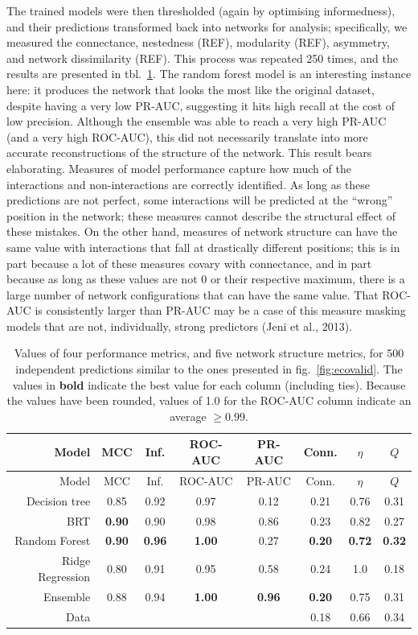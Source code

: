 \documentclass[11pt]{article}
\begin{document}
The trained models were then thresholded (again by optimising
informedness), and their predictions transformed back into networks for
analysis; specifically, we measured the connectance, nestedness (REF),
modularity (REF), asymmetry, and network dissimilarity (REF). This
process was repeated 250 times, and the results are presented in
tbl.~\ref{tbl:comparison}. The random forest model is an interesting
instance here: it produces the network that looks the most like the
original dataset, despite having a very low PR-AUC, suggesting it hits
high recall at the cost of low precision. Although the ensemble was able
to reach a very high PR-AUC (and a very high ROC-AUC), this did not
necessarily translate into more accurate reconstructions of the
structure of the network. This result bears elaborating. Measures of
model performance capture how much of the interactions and
non-interactions are correctly identified. As long as these predictions
are not perfect, some interactions will be predicted at the ``wrong''
position in the network; these measures cannot describe the structural
effect of these mistakes. On the other hand, measures of network
structure can have the same value with interactions that fall at
drastically different positions; this is in part because a lot of these
measures covary with connectance, and in part because as long as these
values are not 0 or their respective maximum, there is a large number of
network configurations that can have the same value. That ROC-AUC is
consistently larger than PR-AUC may be a case of this measure masking
models that are not, individually, strong predictors (Jeni et al.,
2013).

\hypertarget{tbl:comparison}{}
\begin{longtable}[]{@{}rccccccc@{}}
\caption{\label{tbl:comparison}Values of four performance metrics, and
five network structure metrics, for 500 independent predictions similar
to the ones presented in fig.~\ref{fig:ecovalid}. The values in
\textbf{bold} indicate the best value for each column (including ties).
Because the values have been rounded, values of 1.0 for the ROC-AUC
column indicate an average \(\ge 0.99\).}\tabularnewline
\toprule
Model & MCC & Inf. & ROC-AUC & PR-AUC & Conn. & \(\eta\) &
\(Q\)\tabularnewline
\midrule
\endfirsthead
\toprule
Model & MCC & Inf. & ROC-AUC & PR-AUC & Conn. & \(\eta\) &
\(Q\)\tabularnewline
\midrule
\endhead
Decision tree & 0.85 & 0.92 & 0.97 & 0.12 & 0.21 & 0.76 &
0.31\tabularnewline
BRT & \textbf{0.90} & 0.90 & 0.98 & 0.86 & 0.23 & 0.82 &
0.27\tabularnewline
Random Forest & \textbf{0.90} & \textbf{0.96} & \textbf{1.00} & 0.27 &
\textbf{0.20} & \textbf{0.72} & \textbf{0.32}\tabularnewline
Ridge Regression & 0.80 & 0.91 & 0.95 & 0.58 & 0.24 & 1.0 &
0.18\tabularnewline
Ensemble & 0.88 & 0.94 & \textbf{1.00} & \textbf{0.96} & \textbf{0.20} &
0.75 & 0.31\tabularnewline
Data & & & & & 0.18 & 0.66 & 0.34\tabularnewline
\bottomrule
\end{longtable}
\end{document}
